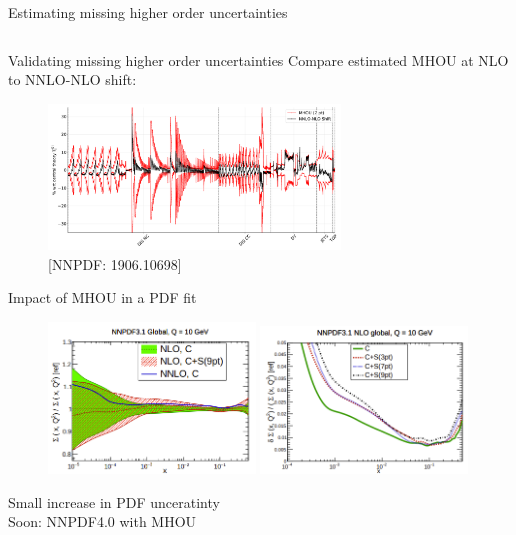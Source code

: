 \documentclass[aspectratio=169, 8pt,t]{beamer}
\begin{document}
\begin{frame}{Estimating missing higher order uncertainties}
\begin{columns}[T]
\begin{column}{0.49\textwidth}
    \end{column}
  \end{columns}
\end{frame}

\begin{frame}{Validating missing higher order uncertainties}
  Compare estimated MHOU at NLO to NNLO-NLO shift:
  \begin{figure}
    \includegraphics[width=0.69\textwidth]{figures/shift_diag_cov_comparison_7pt_global.pdf}
    \caption*{{\color{gray}\small [NNPDF: 1906.10698]}}
  \end{figure}
\end{frame}

\begin{frame}{Impact of MHOU in a PDF fit}
  \begin{figure}
    \includegraphics[width=0.49\textwidth]{figures/nnpdf31mhousinglet.png}
    \includegraphics[width=0.49\textwidth]{figures/nnpdf31mhouuncs.png}
  \end{figure}
  Small increase in PDF unceratinty \\
  Soon: NNPDF4.0 with MHOU
\end{frame}
\end{document}
